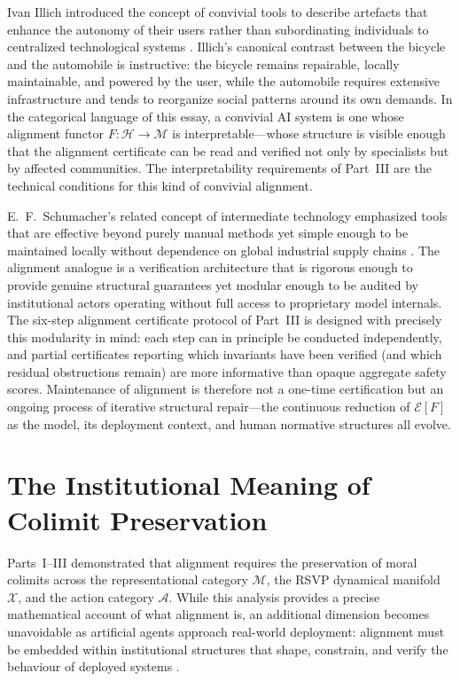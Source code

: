 \documentclass[12pt]{article}
\theoremstyle{definition}
\begin{document}
Ivan Illich introduced the concept of convivial tools to describe artefacts
that enhance the autonomy of their users rather than subordinating individuals
to centralized technological systems \citep{illich1973tools}. Illich's canonical
contrast between the bicycle and the automobile is instructive: the bicycle
remains repairable, locally maintainable, and powered by the user, while the
automobile requires extensive infrastructure and tends to reorganize social
patterns around its own demands. In the categorical language of this essay, a
convivial AI system is one whose alignment functor $F : \mathcal{H} \to
\mathcal{M}$ is interpretable---whose structure is visible enough that the
alignment certificate can be read and verified not only by specialists but by
affected communities. The interpretability requirements of Part~III are the
technical conditions for this kind of convivial alignment.

E.\ F.\ Schumacher's related concept of intermediate technology emphasized
tools that are effective beyond purely manual methods yet simple enough to be
maintained locally without dependence on global industrial supply chains
\citep{schumacher1973small}. The alignment analogue is a verification
architecture that is rigorous enough to provide genuine structural guarantees
yet modular enough to be audited by institutional actors operating without
full access to proprietary model internals. The six-step alignment certificate
protocol of Part~III is designed with precisely this modularity in mind: each
step can in principle be conducted independently, and partial certificates
reporting which invariants have been verified (and which residual obstructions
remain) are more informative than opaque aggregate safety scores. Maintenance
of alignment is therefore not a one-time certification but an ongoing process
of iterative structural repair---the continuous reduction of $\mathcal{E}[F]$
as the model, its deployment context, and human normative structures all evolve.

\section{The Institutional Meaning of Colimit Preservation}

Parts~I--III demonstrated that alignment requires the preservation of moral
colimits across the representational category $\mathcal{M}$, the RSVP dynamical
manifold $\mathcal{X}$, and the action category $\mathcal{A}$. While this
analysis provides a precise mathematical account of what alignment is, an
additional dimension becomes unavoidable as artificial agents approach
real-world deployment: alignment must be embedded within institutional structures
that shape, constrain, and verify the behaviour of deployed systems
\citep{amadon2024evaluating,gabriel2020}.
\end{document}
